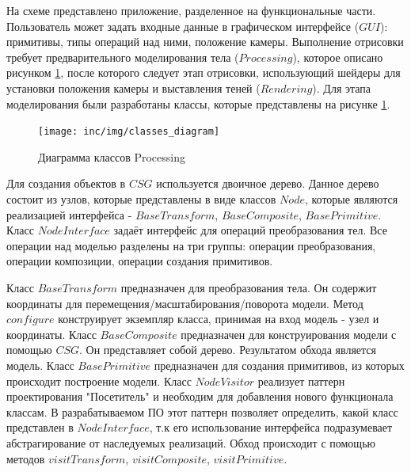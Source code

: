 На схеме представлено приложение, разделенное на функциональные части.
Пользователь может задать входные данные в графическом интерфейсе ($GUI$): примитивы, типы операций над ними,
положение камеры.
Выполнение отрисовки требует предварительного моделирования тела ($Processing$), которое описано рисунком \ref{fig:classes_diagram}, после
которого следует этап отрисовки, использующий шейдеры для установки положения камеры и выставления теней ($Rendering$).
Для этапа моделирования были разработаны классы, которые представлены на рисунке \ref{fig:classes_diagram}.

\begin{figure}[H]
  \centering
  \texttt{[image: inc/img/classes\_diagram]}
  \caption{Диаграмма классов Processing}
  \label{fig:classes_diagram}
\end{figure}

Для создания объектов в $CSG$ используется двоичное дерево.
Данное дерево состоит из узлов, которые представлены в виде классов $Node$, которые являются реализацией интерфейса - 
$BaseTransform$, $BaseComposite$, $BasePrimitive$.
Класс $NodeInterface$ задаёт интерфейс для операций преобразования тел. 
Все операции над моделью разделены на три группы: операции преобразования,
операции композиции, операции создания примитивов. 

Класс $BaseTransform$ предназначен для преобразования тела. Он содержит координаты 
для перемещения/масштабирования/поворота модели. 
Метод $configure$ конструирует экземпляр класса, принимая на вход модель - узел и координаты.  
Класс $BaseComposite$ предназначен для конструирования модели с помощью $CSG$.  
Он представляет собой дерево. Результатом обхода является модель. 
Класс $BasePrimitive$ предназначен для создания примитивов, из которых происходит построение 
модели.
Класс $NodeVisitor$ реализует паттерн проектирования "Посетитель" и необходим для добавления
нового функционала классам. В разрабатываемом ПО этот паттерн позволяет определить,
какой класс представлен в $NodeInterface$, т.к его использование интерфейса подразумевает 
абстрагирование от наследуемых реализаций. Обход происходит с помощью методов 
$visitTransform$, $visitComposite$, $visitPrimitive$.  


